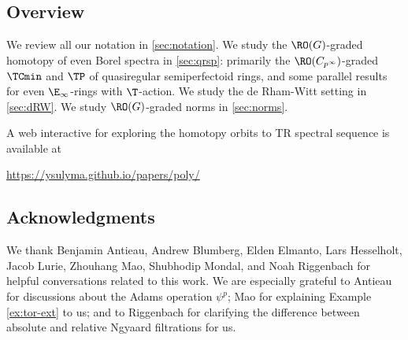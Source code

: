 \subsection{Overview}

We review all our notation in \sec\ref{sec:notation}. We study the $\RO(G)$-graded homotopy of even Borel spectra in \sec\ref{sec:qrsp}: primarily the $\RO(C_{p^\infty})$-graded $\TCmin$ and $\TP$ of quasiregular semiperfectoid rings, and some parallel results for even $\E_\infty$-rings with $\T$-action. We study the de Rham-Witt setting in \sec\ref{sec:dRW}. We study $\RO(G)$-graded norms in \sec\ref{sec:norms}.

A web interactive for exploring the homotopy orbits to TR spectral sequence is available at

\begin{center}
  \url{https://ysulyma.github.io/papers/poly/}
\end{center}

\subsection{Acknowledgments}

We thank Benjamin Antieau, Andrew Blumberg, Elden Elmanto, Lars Hesselholt, Jacob Lurie, Zhouhang Mao, Shubhodip Mondal, and Noah Riggenbach for helpful conversations related to this work. We are especially grateful to Antieau for discussions about the Adams operation $\psi^p$; Mao for explaining Example \ref{ex:tor-ext} to us; and to Riggenbach for clarifying the difference between absolute and relative Ngyaard filtrations for us.
